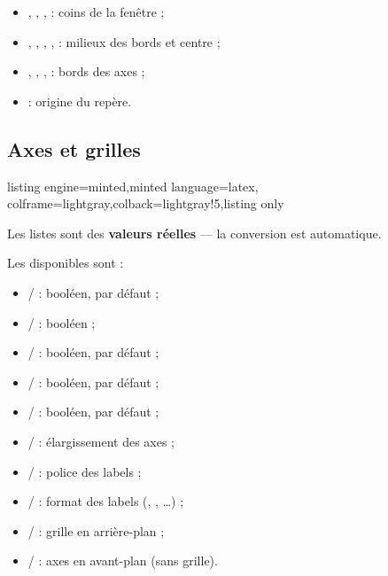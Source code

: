 \documentclass[11pt,a4paper]{ltxdoc}
\begin{document}
\begin{itemize}
	\item {}, , ,  : coins de la fenêtre ;
	\item {}, , , ,  : milieux des bords et centre ;
	\item {}, , ,  : bords des axes ;
	\item {} : origine du repère.
\end{itemize}

\pagebreak

\subsection{Axes et grilles}

\begin{tcblisting}{listing engine=minted,minted language=latex,
  colframe=lightgray,colback=lightgray!5,listing only}
\end{tcblisting}

Les listes sont des \textbf{valeurs réelles} — la conversion est automatique.

\smallskip

Les \MontreCode{[clés]} disponibles sont :

\begin{itemize}
	\item {} /  : booléen,  par défaut ;
	\item {} /  : booléen ;
	\item {} /  : booléen,  par défaut ;
	\item {} /  : booléen,  par défaut ;
	\item {} /  : booléen,  par défaut ;
	\item {} /  : élargissement des axes ;
	\item {} /  : police des labels ;
	\item {} /  : format des labels (, , \ldots) ;
	\item {} /  : grille en arrière-plan ;
	\item {} /  : axes en avant-plan (sans grille).
\end{itemize}
\end{document}
